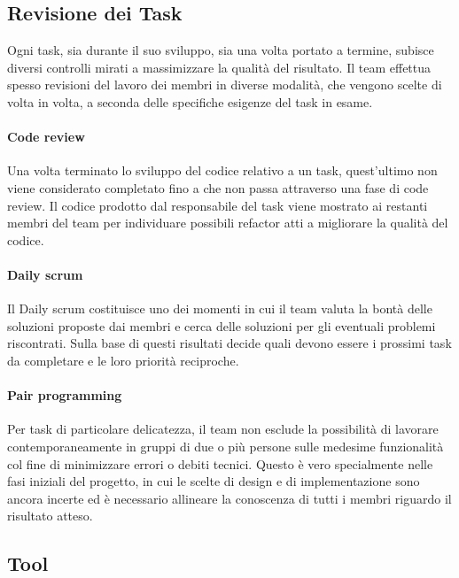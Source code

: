 \subsection{Revisione dei Task}

Ogni task, sia durante il suo sviluppo, sia una volta portato a termine, subisce diversi controlli mirati a massimizzare la qualità del risultato.
%
Il team effettua spesso revisioni del lavoro dei membri in diverse modalità, che vengono scelte di volta in volta, a seconda delle specifiche esigenze del task in esame.

\paragraph{Code review}

Una volta terminato lo sviluppo del codice relativo a un task, quest'ultimo non viene considerato completato fino a che non passa attraverso una fase di code review.
%
Il codice prodotto dal responsabile del task viene mostrato ai restanti membri del team per individuare possibili refactor atti a migliorare la qualità del codice.

\paragraph{Daily scrum}

Il Daily scrum costituisce uno dei momenti in cui il team valuta la bontà delle soluzioni proposte dai membri e cerca delle soluzioni per gli eventuali problemi riscontrati.
%
Sulla base di questi risultati decide quali devono essere i prossimi task da completare e le loro priorità reciproche.

\paragraph{Pair programming}

Per task di particolare delicatezza, il team non esclude la possibilità di lavorare contemporaneamente in gruppi di due o più persone sulle medesime funzionalità col fine di minimizzare errori o debiti tecnici.
%
Questo è vero specialmente nelle fasi iniziali del progetto, in cui le scelte di design e di implementazione sono ancora incerte ed è necessario allineare la conoscenza di tutti i membri riguardo il risultato atteso.

\subsection{Tool}


